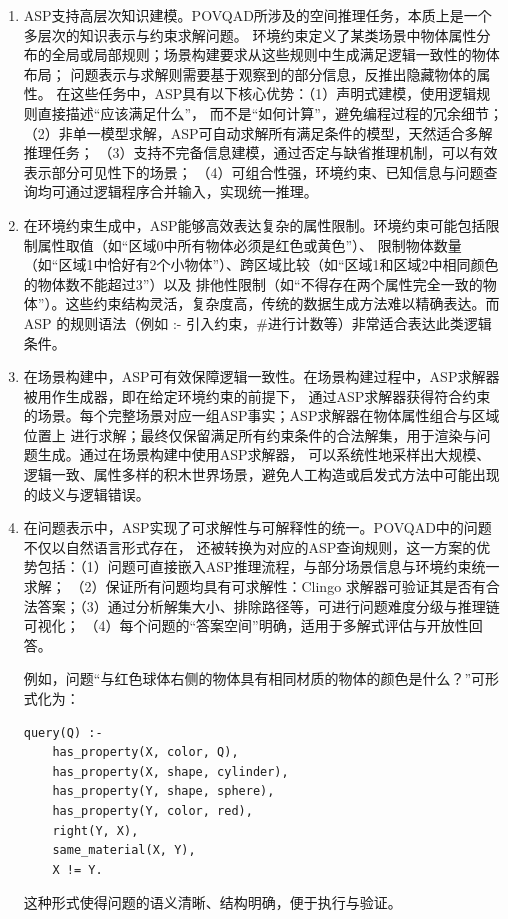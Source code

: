 \begin{enumerate}[nosep]
\item ASP支持高层次知识建模。POVQAD所涉及的空间推理任务，本质上是一个多层次的知识表示与约束求解问题。
环境约束定义了某类场景中物体属性分布的全局或局部规则；场景构建要求从这些规则中生成满足逻辑一致性的物体布局；
问题表示与求解则需要基于观察到的部分信息，反推出隐藏物体的属性。
在这些任务中，ASP具有以下核心优势：（1）声明式建模，使用逻辑规则直接描述“应该满足什么”，
而不是“如何计算”，避免编程过程的冗余细节；（2）非单一模型求解，ASP可自动求解所有满足条件的模型，天然适合多解推理任务；
（3）支持不完备信息建模，通过否定与缺省推理机制，可以有效表示部分可见性下的场景；
（4）可组合性强，环境约束、已知信息与问题查询均可通过逻辑程序合并输入，实现统一推理。
\item 在环境约束生成中，ASP能够高效表达复杂的属性限制。环境约束可能包括限制属性取值（如“区域0中所有物体必须是红色或黄色”）、
限制物体数量（如“区域1中恰好有2个小物体”）、跨区域比较（如“区域1和区域2中相同颜色的物体数不能超过3”）以及
排他性限制（如“不得存在两个属性完全一致的物体”）。这些约束结构灵活，复杂度高，传统的数据生成方法难以精确表达。而 ASP 的规则语法（例如 :- 引入约束，\#进行计数等）非常适合表达此类逻辑条件。
\item 在场景构建中，ASP可有效保障逻辑一致性。在场景构建过程中，ASP求解器被用作生成器，即在给定环境约束的前提下，
通过ASP求解器获得符合约束的场景。每个完整场景对应一组ASP事实；ASP求解器在物体属性组合与区域位置上
进行求解；最终仅保留满足所有约束条件的合法解集，用于渲染与问题生成。通过在场景构建中使用ASP求解器，
可以系统性地采样出大规模、逻辑一致、属性多样的积木世界场景，避免人工构造或启发式方法中可能出现的歧义与逻辑错误。
\item 在问题表示中，ASP实现了可求解性与可解释性的统一。POVQAD中的问题不仅以自然语言形式存在，
还被转换为对应的ASP查询规则，这一方案的优势包括：（1）问题可直接嵌入ASP推理流程，与部分场景信息与环境约束统一求解；
（2）保证所有问题均具有可求解性：Clingo 求解器可验证其是否有合法答案；（3）通过分析解集大小、排除路径等，可进行问题难度分级与推理链可视化；
（4）每个问题的“答案空间”明确，适用于多解式评估与开放性回答。

例如，问题“与红色球体右侧的物体具有相同材质的物体的颜色是什么？”可形式化为：
\begin{lstlisting}
query(Q) :-
    has_property(X, color, Q),
    has_property(X, shape, cylinder),
    has_property(Y, shape, sphere),
    has_property(Y, color, red),
    right(Y, X),
    same_material(X, Y),
    X != Y.
\end{lstlisting}

这种形式使得问题的语义清晰、结构明确，便于执行与验证。
\end{enumerate}

